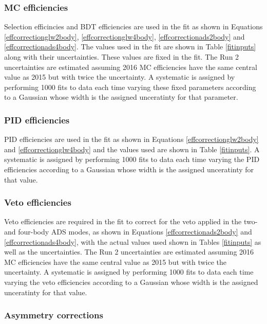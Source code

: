 \subsubsection{MC efficiencies}

Selection efficincies and BDT efficiencies are used in the \CP fit as shown in Equations \ref{effcorrectionglw2body}, \ref{effcorrectionglw4body}, \ref{effcorrectionads2body} and \ref{effcorrectionads4body}. The values used in the \CP fit are shown in Table \ref{fitinputs} along with their uncertainties. These values are fixed in the \CP fit. The Run 2 uncertainties are estimated assuming 2016 MC efficiencies have the same central value as 2015 but with twice the uncertainty.  A systematic is assigned by performing 1000 fits to data each time varying these fixed parameters according to a Gaussian whose width is the assigned unceratinty for that parameter.

\subsubsection{PID efficiencies}

PID efficiencies are used in the \CP fit as shown in Equations \ref{effcorrectionglw2body} and \ref{effcorrectionglw4body} and the values used are shown in Table \ref{fitinputs}. A systematic is assigned by performing 1000 fits to data each time varying the PID efficiencies according to a Gaussian whose width is the assigned unceratinty for that value.

\subsubsection{Veto efficiencies}

Veto efficiencies are required in the \CP fit to correct for the veto applied in the two- and four-body ADS modes, as shown in Equations \ref{effcorrectionads2body} and \ref{effcorrectionads4body}, with the actual values used shown in Tables \ref{fitinputs} as well as the uncertainties. The Run 2 uncertainties are estimated assuming 2016 MC efficiencies have the same central value as 2015 but with twice the uncertainty. A systematic is assigned by performing 1000 fits to data each time varying the veto efficiencies according to a Gaussian whose width is the assigned unceratinty for that value.

\subsubsection{Asymmetry corrections}

